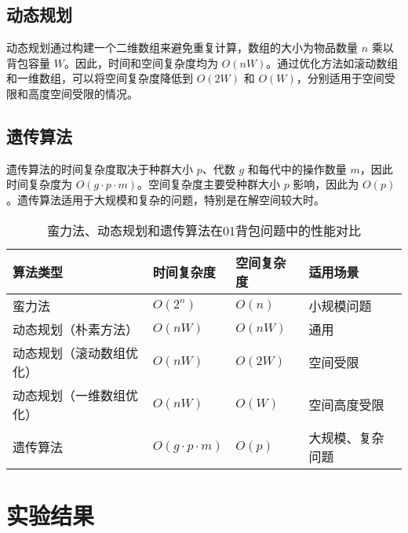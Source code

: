 \documentclass[UTF8,titlepage]{ctexart}
\numberwithin{figure}{section}
\begin{document}
\subsection{动态规划}
动态规划通过构建一个二维数组来避免重复计算，数组的大小为物品数量 $n$ 乘以背包容量 $W$。因此，时间和空间复杂度均为 $O(nW)$。通过优化方法如滚动数组和一维数组，可以将空间复杂度降低到 $O(2W)$ 和 $O(W)$，分别适用于空间受限和高度空间受限的情况。

\subsection{遗传算法}
遗传算法的时间复杂度取决于种群大小 $p$、代数 $g$ 和每代中的操作数量 $m$，因此时间复杂度为 $O(g \cdot p \cdot m)$。空间复杂度主要受种群大小 $p$ 影响，因此为 $O(p)$。遗传算法适用于大规模和复杂的问题，特别是在解空间较大时。
\begin{table}[htbp]
    \centering
    \caption{蛮力法、动态规划和遗传算法在01背包问题中的性能对比}
    \begin{tabular}{@{}llll@{}}
    \toprule
    算法类型 & 时间复杂度 & 空间复杂度 & 适用场景 \\ \midrule
    蛮力法 & $O(2^n)$ & $O(n)$ & 小规模问题 \\
    动态规划（朴素方法） & $O(nW)$ & $O(nW)$ & 通用 \\
    动态规划（滚动数组优化） & $O(nW)$ & $O(2W)$ & 空间受限 \\
    动态规划（一维数组优化） & $O(nW)$ & $O(W)$ & 空间高度受限 \\
    遗传算法 & $O(g \cdot p \cdot m)$ & $O(p)$ & 大规模、复杂问题 \\ \bottomrule
    \end{tabular}
    \end{table}

\newpage

\section{实验结果}
\end{document}
